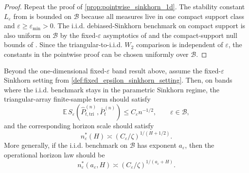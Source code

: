 \begin{proof}
Repeat the proof of \cref{prop:pointwise_sinkhorn_1d}. The stability constant
$L_{\varepsilon}$ from \citet[Thm.~3.7(ii), Ex.~3.4]{EcksteinNutz2022} is bounded
on $\mathcal B$ because all measures live in one compact support class and
$\varepsilon\ge\varepsilon_{\min}>0$. The i.i.d. debiased-Sinkhorn benchmark on
compact support is also uniform on $\mathcal B$ by the fixed-$\varepsilon$
asymptotics of \citet{GoldfeldEtAl2022} and the compact-support null bounds of
\citet[Thm.~5.1, after fixed-$\varepsilon$ rescaling]{delBarrioEtAl2023}. Since
the triangular-to-i.i.d. $W_2$ comparison is independent of $\varepsilon$, the
constants in the pointwise proof can be chosen uniformly over $\mathcal B$.
\end{proof}

\begin{conjecture}
\label{conj:embedded_sinkhorn_horizon}
Beyond the one-dimensional fixed-$\varepsilon$ band result above, assume the fixed-$\varepsilon$ Sinkhorn setting from
\cref{def:fixed_epsilon_sinkhorn_setting}. Then, on bands where the i.i.d.
benchmark stays in the parametric Sinkhorn regime, the triangular-array
finite-sample term should satisfy
\[
  \mathbb E\,S_{\varepsilon}\!\left(\widehat P_{t,\mathrm{tri}}^{(n)},\bar P_t^{(n)}\right)
  \le C_{\varepsilon} n^{-1/2},
  \qquad \varepsilon\in\mathcal B,
\]
and the corresponding horizon scale should satisfy
\[
  n_{\varepsilon}^*(H) \asymp (C_{\varepsilon}/\zeta)^{1/(H+1/2)}.
\]
More generally, if the i.i.d. benchmark on $\mathcal B$ has exponent
$a_{\varepsilon}$, then the operational horizon law should be
\[
  n_{\varepsilon}^*(a_{\varepsilon},H)
  \asymp (C_{\varepsilon}/\zeta)^{1/(a_{\varepsilon}+H)}.
\]
\end{conjecture}

